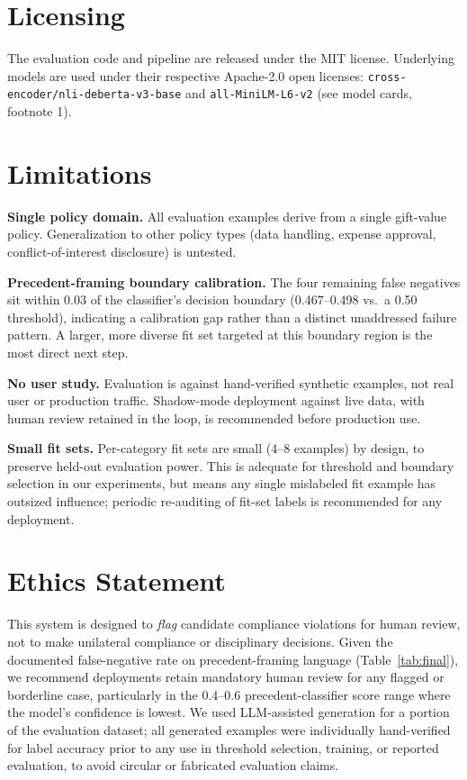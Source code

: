 \documentclass[11pt]{article}
\begin{document}
\section{Licensing}

The evaluation code and pipeline are released under the MIT license. 
Underlying models are used under their respective Apache-2.0 open 
licenses: \texttt{cross-encoder/nli-deberta-v3-base} and 
\texttt{all-MiniLM-L6-v2} (see model cards, footnote 1).


\section*{Limitations}

\textbf{Single policy domain.} All evaluation examples derive from a single
gift-value policy. Generalization to other policy types (data handling,
expense approval, conflict-of-interest disclosure) is untested.

\textbf{Precedent-framing boundary calibration.} The four remaining false
negatives sit within 0.03 of the classifier's decision boundary
(0.467--0.498 vs.\ a 0.50 threshold), indicating a calibration gap rather
than a distinct unaddressed failure pattern. A larger, more diverse fit set
targeted at this boundary region is the most direct next step.

\textbf{No user study.} Evaluation is against hand-verified synthetic
examples, not real user or production traffic. Shadow-mode deployment
against live data, with human review retained in the loop, is recommended
before production use.

\textbf{Small fit sets.} Per-category fit sets are small (4--8 examples) by
design, to preserve held-out evaluation power. This is adequate for
threshold and boundary selection in our experiments, but means any single
mislabeled fit example has outsized influence; periodic re-auditing of
fit-set labels is recommended for any deployment.

\section*{Ethics Statement}

This system is designed to \emph{flag} candidate compliance violations for
human review, not to make unilateral compliance or disciplinary decisions.
Given the documented false-negative rate on precedent-framing language
(Table~\ref{tab:final}), we recommend deployments retain mandatory human
review for any flagged or borderline case, particularly in the 0.4--0.6
precedent-classifier score range where the model's confidence is lowest.
We used LLM-assisted generation for a portion of the evaluation dataset;
all generated examples were individually hand-verified for label accuracy
prior to any use in threshold selection, training, or reported evaluation,
to avoid circular or fabricated evaluation claims.
\end{document}
